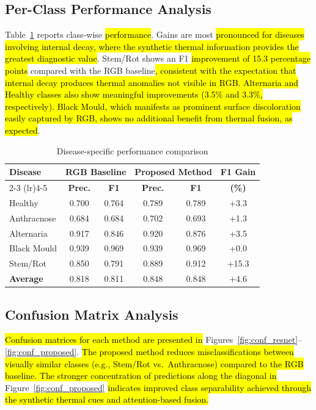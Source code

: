 \documentclass[utf8]{FrontiersinHarvard}
\begin{document}
\subsection{Per-Class Performance Analysis}
Table~\ref{tab:perclass} reports class-wise \hl{performance}. Gains are most \hl{pronounced for diseases involving internal decay, where the synthetic thermal information provides the greatest diagnostic value}. Stem/Rot shows an F1 \hl{improvement of 15.3 percentage points} compared with the RGB baseline\hl{, consistent with the expectation that internal decay produces thermal anomalies not visible in RGB. Alternaria and Healthy classes also show meaningful improvements (3.5\% and 3.3\%, respectively). Black Mould, which manifests as prominent surface discoloration easily captured by RGB, shows no additional benefit from thermal fusion, as expected}.

\begin{table}[h!]
    \caption{Disease-specific performance comparison}
    \label{tab:perclass}
    \raggedright
    \scriptsize
    \begin{tabular}{lccccc}
        \toprule
        \multirow{2}{*}{\textbf{Disease}} & \multicolumn{2}{c}{\textbf{RGB Baseline}} & \multicolumn{2}{c}{\textbf{Proposed Method}} & \textbf{F1 Gain} \\
        \cmidrule(lr){2-3} \cmidrule(lr){4-5}
         & \textbf{Prec.} & \textbf{F1} & \textbf{Prec.} & \textbf{F1} & \textbf{(\%)} \\
        \midrule
        Healthy & 0.700 & 0.764 & 0.789 & 0.789 & +3.3 \\
        Anthracnose & 0.684 & 0.684 & 0.702 & 0.693 & +1.3 \\
        Alternaria & 0.917 & 0.846 & 0.920 & 0.876 & +3.5 \\
        Black Mould & 0.939 & 0.969 & 0.939 & 0.969 & +0.0 \\
        Stem/Rot & 0.850 & 0.791 & 0.889 & 0.912 & +15.3 \\
        \midrule
        \textbf{Average} & 0.818 & 0.811 & 0.848 & 0.848 & +4.6 \\
        \bottomrule
    \end{tabular}
\end{table}

\subsection{Confusion Matrix Analysis}
\hl{Confusion matrices for each method are presented in} Figures~\ref{fig:conf_resnet}--\ref{fig:conf_proposed}. \hl{The proposed method reduces misclassifications between visually similar classes (e.g., Stem/Rot vs.\ Anthracnose) compared to the RGB baseline. The stronger concentration of predictions along the diagonal in} Figure~\ref{fig:conf_proposed} \hl{indicates improved class separability achieved through the synthetic thermal cues and attention-based fusion.}
\end{document}
